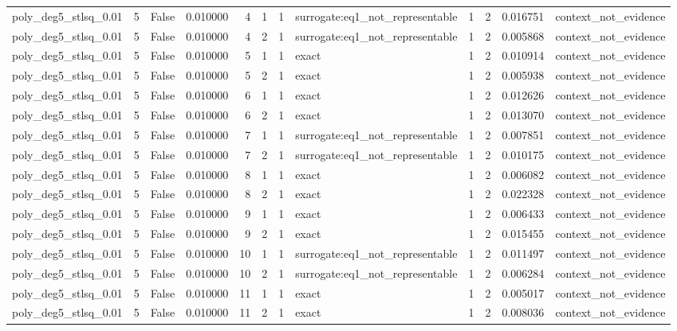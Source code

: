 \begin{tabular}{lrrrrrrlrrrl}
poly\_deg5\_stlsq\_0.01 & 5 & False & 0.010000 & 4 & 1 & 1 & surrogate:eq1\_not\_representable & 1 & 2 & 0.016751 & context\_not\_evidence \\
poly\_deg5\_stlsq\_0.01 & 5 & False & 0.010000 & 4 & 2 & 1 & surrogate:eq1\_not\_representable & 1 & 2 & 0.005868 & context\_not\_evidence \\
poly\_deg5\_stlsq\_0.01 & 5 & False & 0.010000 & 5 & 1 & 1 & exact & 1 & 2 & 0.010914 & context\_not\_evidence \\
poly\_deg5\_stlsq\_0.01 & 5 & False & 0.010000 & 5 & 2 & 1 & exact & 1 & 2 & 0.005938 & context\_not\_evidence \\
poly\_deg5\_stlsq\_0.01 & 5 & False & 0.010000 & 6 & 1 & 1 & exact & 1 & 2 & 0.012626 & context\_not\_evidence \\
poly\_deg5\_stlsq\_0.01 & 5 & False & 0.010000 & 6 & 2 & 1 & exact & 1 & 2 & 0.013070 & context\_not\_evidence \\
poly\_deg5\_stlsq\_0.01 & 5 & False & 0.010000 & 7 & 1 & 1 & surrogate:eq1\_not\_representable & 1 & 2 & 0.007851 & context\_not\_evidence \\
poly\_deg5\_stlsq\_0.01 & 5 & False & 0.010000 & 7 & 2 & 1 & surrogate:eq1\_not\_representable & 1 & 2 & 0.010175 & context\_not\_evidence \\
poly\_deg5\_stlsq\_0.01 & 5 & False & 0.010000 & 8 & 1 & 1 & exact & 1 & 2 & 0.006082 & context\_not\_evidence \\
poly\_deg5\_stlsq\_0.01 & 5 & False & 0.010000 & 8 & 2 & 1 & exact & 1 & 2 & 0.022328 & context\_not\_evidence \\
poly\_deg5\_stlsq\_0.01 & 5 & False & 0.010000 & 9 & 1 & 1 & exact & 1 & 2 & 0.006433 & context\_not\_evidence \\
poly\_deg5\_stlsq\_0.01 & 5 & False & 0.010000 & 9 & 2 & 1 & exact & 1 & 2 & 0.015455 & context\_not\_evidence \\
poly\_deg5\_stlsq\_0.01 & 5 & False & 0.010000 & 10 & 1 & 1 & surrogate:eq1\_not\_representable & 1 & 2 & 0.011497 & context\_not\_evidence \\
poly\_deg5\_stlsq\_0.01 & 5 & False & 0.010000 & 10 & 2 & 1 & surrogate:eq1\_not\_representable & 1 & 2 & 0.006284 & context\_not\_evidence \\
poly\_deg5\_stlsq\_0.01 & 5 & False & 0.010000 & 11 & 1 & 1 & exact & 1 & 2 & 0.005017 & context\_not\_evidence \\
poly\_deg5\_stlsq\_0.01 & 5 & False & 0.010000 & 11 & 2 & 1 & exact & 1 & 2 & 0.008036 & context\_not\_evidence \\

\end{tabular}
